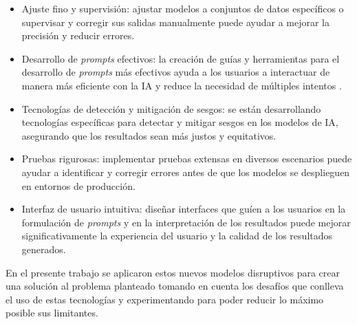 \begin{itemize}
    \item Ajuste fino y supervisión: ajustar modelos a conjuntos de datos específicos o supervisar y corregir sus salidas manualmente puede ayudar a mejorar la precisión y reducir errores.
    \item Desarrollo de \textit{prompts} efectivos: la creación de guías y herramientas para el desarrollo de \textit{prompts} más efectivos ayuda a los usuarios a interactuar de manera más eficiente con la IA y reduce la necesidad de múltiples intentos \citep{HatchWorks2024} \citep{arXiv2024Prompt}.
    \item Tecnologías de detección y mitigación de sesgos: se están desarrollando tecnologías específicas para detectar y mitigar sesgos en los modelos de IA, asegurando que los resultados sean más justos y equitativos.
    \item Pruebas rigurosas: implementar pruebas extensas en diversos escenarios puede ayudar a identificar y corregir errores antes de que los modelos se desplieguen en entornos de producción.
    \item Interfaz de usuario intuitiva: diseñar interfaces que guíen a los usuarios en la formulación de \textit{prompts} y en la interpretación de los resultados puede mejorar significativamente la experiencia del usuario y la calidad de los resultados generados.
\end{itemize}

En el presente trabajo se aplicaron estos nuevos modelos disruptivos para crear una solución al problema planteado tomando en cuenta los desafíos que conlleva el uso de estas tecnologías y experimentando para poder reducir lo máximo posible sus limitantes.